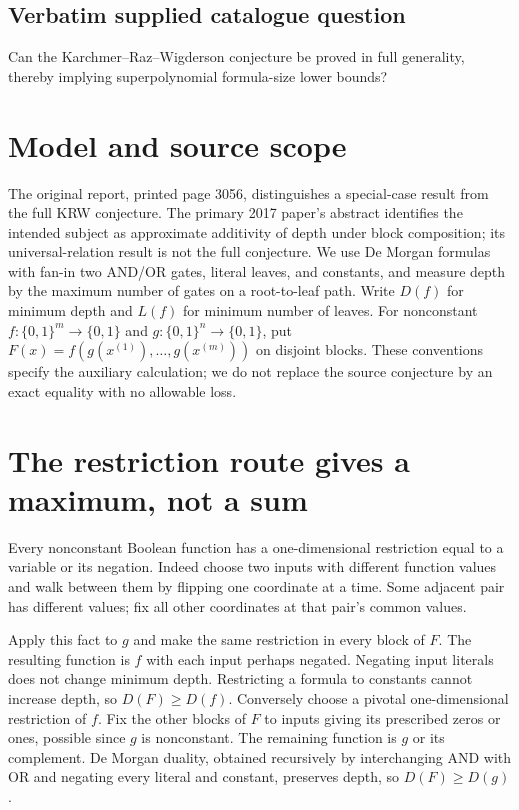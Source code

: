 \documentclass[11pt]{article}
\begin{document}
\subsection{Verbatim supplied catalogue question}
Can the Karchmer–Raz–Wigderson conjecture be proved in full generality, thereby implying superpolynomial formula-size lower bounds?

\section{Model and source scope}
The original report, printed page 3056, distinguishes a special-case result
from the full KRW conjecture. The primary 2017 paper's abstract identifies
the intended subject as approximate additivity of depth under block
composition; its universal-relation result is not the full conjecture.
We use De Morgan formulas with fan-in two AND/OR gates, literal leaves,
and constants, and measure depth by the maximum number of gates on a
root-to-leaf path. Write $D(f)$ for minimum depth and $L(f)$ for minimum
number of leaves. For nonconstant $f:\{0,1\}^m\to\{0,1\}$ and
$g:\{0,1\}^n\to\{0,1\}$, put
$F(x)=f(g(x^{(1)}),\ldots,g(x^{(m)}))$ on disjoint blocks.
These conventions specify the auxiliary calculation; we do not replace
the source conjecture by an exact equality with no allowable loss.

\section{The restriction route gives a maximum, not a sum}
Every nonconstant Boolean function has a one-dimensional restriction
equal to a variable or its negation. Indeed choose two inputs with
different function values and walk between them by flipping one
coordinate at a time. Some adjacent pair has different values; fix
all other coordinates at that pair's common values.

Apply this fact to $g$ and make the same restriction in every block of
$F$. The resulting function is $f$ with each input perhaps negated.
Negating input literals does not change minimum depth. Restricting a
formula to constants cannot increase depth, so $D(F)\ge D(f)$.
Conversely choose a pivotal one-dimensional restriction of $f$.
Fix the other blocks of $F$ to inputs giving its prescribed zeros or
ones, possible since $g$ is nonconstant. The remaining function is
$g$ or its complement. De Morgan duality, obtained recursively by
interchanging AND with OR and negating every literal and constant,
preserves depth, so $D(F)\ge D(g)$.
\end{document}
